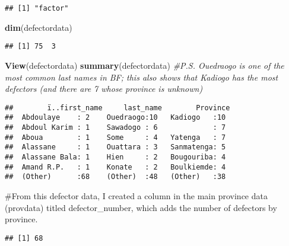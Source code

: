 \documentclass[]{article}
\newenvironment{Shaded}{\begin{snugshade}}{\end{snugshade}}
\newcommand{\CommentTok}[1]{\textcolor[rgb]{0.56,0.35,0.01}{\textit{#1}}}
\newcommand{\KeywordTok}[1]{\textcolor[rgb]{0.13,0.29,0.53}{\textbf{#1}}}
\newcommand{\NormalTok}[1]{#1}
\newcommand{\OperatorTok}[1]{\textcolor[rgb]{0.81,0.36,0.00}{\textbf{#1}}}
\begin{document}
\begin{verbatim}
## [1] "factor"
\end{verbatim}

\begin{Shaded}
\begin{Highlighting}[]
\KeywordTok{dim}\NormalTok{(defectordata)}
\end{Highlighting}
\end{Shaded}

\begin{verbatim}
## [1] 75  3
\end{verbatim}

\begin{Shaded}
\begin{Highlighting}[]
\KeywordTok{View}\NormalTok{(defectordata)}
\KeywordTok{summary}\NormalTok{(defectordata) }\CommentTok{\#P.S. Ouedraogo is one of the most common last names in BF; this also shows that Kadiogo has the most defectors (and there are 7 whose province is unknown)}
\end{Highlighting}
\end{Shaded}

\begin{verbatim}
##        ï..first_name     last_name        Province 
##  Abdoulaye    : 2    Ouedraogo:10   Kadiogo   :10  
##  Abdoul Karim : 1    Sawadogo : 6             : 7  
##  Aboua        : 1    Some     : 4   Yatenga   : 7  
##  Alassane     : 1    Ouattara : 3   Sanmatenga: 5  
##  Alassane Bala: 1    Hien     : 2   Bougouriba: 4  
##  Amand R.P.   : 1    Konate   : 2   Boulkiemde: 4  
##  (Other)      :68    (Other)  :48   (Other)   :38
\end{verbatim}

\#From this defector data, I created a column in the main province data
(provdata) titled defector\_number, which adds the number of defectors
by province.

\begin{Shaded}
\end{Shaded}

\begin{verbatim}
## [1] 68
\end{verbatim}

\begin{Shaded}
\end{Shaded}
\end{document}
